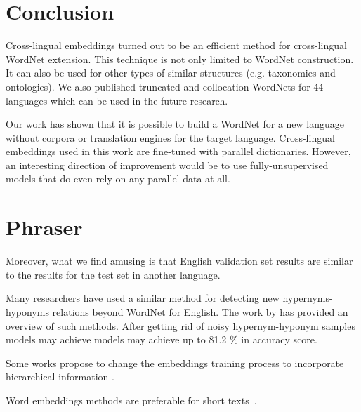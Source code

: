 \documentclass[11pt,a4paper]{article}
\begin{document}
\section{Conclusion}
Cross-lingual embeddings turned out to be an efficient method for cross-lingual WordNet extension. This technique is not only limited to WordNet construction. It can also be used for other types of similar structures (e.g. taxonomies and ontologies). We also published truncated and collocation WordNets for 44 languages which can be used in the future research.

Our work has shown that it is possible to build a WordNet for a new language without corpora or translation engines for the target language. Cross-lingual embeddings used in this work are fine-tuned with parallel dictionaries. However, an interesting direction of improvement would be to use fully-unsupervised models that do even rely on any parallel data at all.
\section{Phraser}
Moreover, what we find amusing is that English validation set results are similar to the results for the test set in another language.

Many researchers have used a similar method for detecting new hypernyms-hyponyms relations beyond WordNet for English. The work by \cite{sanchez2017well} has provided an overview of such methods. After getting rid of noisy hypernym-hyponym samples models may achieve models may achieve up to 81.2 \% in  accuracy score.

Some works propose to change the embeddings training process to incorporate hierarchical information \cite{alsuhaibani}.

Word embeddings methods are preferable for short texts~\cite{maslova-potapov}.



\end{document}
